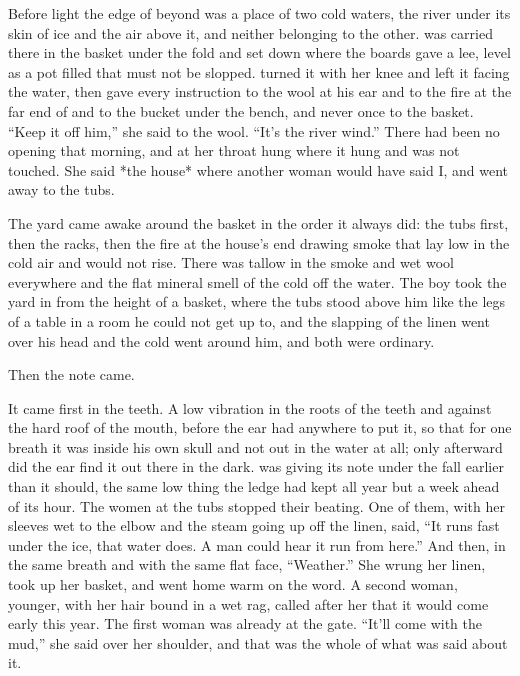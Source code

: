 
Before light the edge of  beyond  was a place of two cold waters, the river under its skin of ice and the air above it, and neither belonging to the other.  was carried there in the basket under the fold and set down where the boards gave a lee, level as a pot filled that must not be slopped.  turned it with her knee and left it facing the water, then gave every instruction to the wool at his ear and to the fire at the far end of  and to the bucket under the bench, and never once to the basket. “Keep it off him,” she said to the wool. “It's the river wind.” There had been no opening that morning, and  at her throat hung where it hung and was not touched. She said *the house* where another woman would have said I, and went away to the tubs.

The yard came awake around the basket in the order it always did: the tubs first, then the racks, then the fire at the house's end drawing smoke that lay low in the cold air and would not rise. There was tallow in the smoke and wet wool everywhere and the flat mineral smell of the cold off the water. The boy took the yard in from the height of a basket, where the tubs stood above him like the legs of a table in a room he could not get up to, and the slapping of the linen went over his head and the cold went around him, and both were ordinary.

Then the note came.

It came first in the teeth. A low vibration in the roots of the teeth and against the hard roof of the mouth, before the ear had anywhere to put it, so that for one breath it was inside his own skull and not out in the water at all; only afterward did the ear find it out there in the dark.  was giving its note under the fall earlier than it should, the same low thing the ledge had kept all year but a week ahead of its hour. The women at the tubs stopped their beating. One of them, with her sleeves wet to the elbow and the steam going up off the linen, said, “It runs fast under the ice, that water does. A man could hear it run from here.” And then, in the same breath and with the same flat face, “Weather.” She wrung her linen, took up her basket, and went home warm on the word. A second woman, younger, with her hair bound in a wet rag, called after her that it would come early this year. The first woman was already at the gate. “It'll come with the mud,” she said over her shoulder, and that was the whole of what was said about it.

